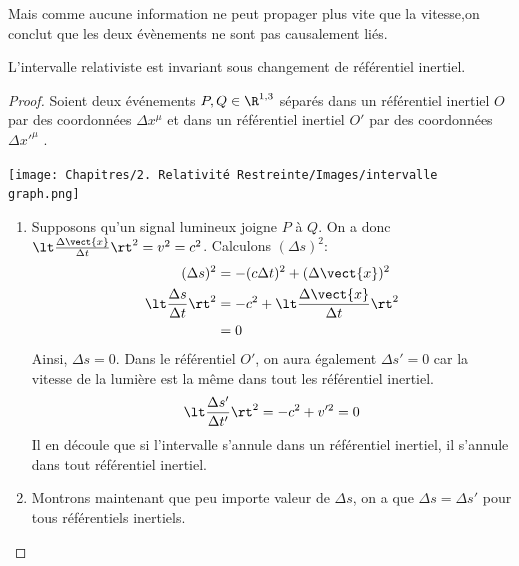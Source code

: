 {Mais comme aucune information ne peut propager plus vite que la vitesse,on conclut que les deux évènements ne sont pas causalement liés. 

\begin{theoremframe}
    \begin{propri}
        L'intervalle relativiste est invariant sous changement de référentiel inertiel.
    \end{propri}
\end{theoremframe}
\begin{proof}
    Soient deux événements $P,Q \in \R^{1,3}$ séparés dans un référentiel inertiel $O$ par des coordonnées $\Delta x^{\mu}$ et dans un référentiel inertiel $O'$ par des coordonnées $\Delta x'^{\mu}$ .

    \begin{center}
        \texttt{[image: Chapitres/2. Relativité Restreinte/Images/intervalle graph.png]}
    \end{center}
    \begin{enumerate}
        \item Supposons qu'un signal lumineux joigne $P$ à $Q$. On a donc $\lt \frac{\Delta \vect{x}}{\Delta t} \rt^2 = v^2 = c^2$. Calculons $(\Delta s )^2$:
        \begin{align}
            (\Delta s )^2  & = -(c\Delta t)^2 + (\Delta \vect{x})^2\\
            \lt\frac{\Delta s}{\Delta t}\rt^2 & = -c^2 + \lt \frac{\Delta \vect{x}}{\Delta t} \rt^2\\
            & =0
        \end{align}
        Ainsi, $\Delta s = 0$. Dans le référentiel $O'$, on aura également $\Delta s' = 0$  car la vitesse de la lumière est la même dans tout les référentiel inertiel.
        \begin{equation}
            \lt \frac{\Delta s'}{\Delta t'} \rt^2 = -c^2 + v'^2 = 0
        \end{equation}
        Il en découle que si l'intervalle s'annule dans un référentiel inertiel, il s'annule dans tout référentiel inertiel. \\
        \item Montrons maintenant que peu importe valeur de $\Delta s$, on a que $\Delta s = \Delta s' $ pour tous référentiels inertiels.


\end{enumerate}
\end{proof}}
